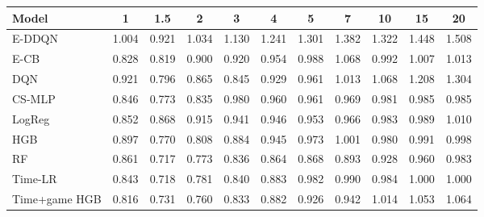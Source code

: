 \begin{tabular}{lcccccccccc}
\toprule
Model & 1 & 1.5 & 2 & 3 & 4 & 5 & 7 & 10 & 15 & 20 \\
\midrule
E-DDQN & 1.004 & 0.921 & 1.034 & 1.130 & 1.241 & 1.301 & 1.382 & 1.322 & 1.448 & 1.508 \\
E-CB & 0.828 & 0.819 & 0.900 & 0.920 & 0.954 & 0.988 & 1.068 & 0.992 & 1.007 & 1.013 \\
DQN & 0.921 & 0.796 & 0.865 & 0.845 & 0.929 & 0.961 & 1.013 & 1.068 & 1.208 & 1.304 \\
CS-MLP & 0.846 & 0.773 & 0.835 & 0.980 & 0.960 & 0.961 & 0.969 & 0.981 & 0.985 & 0.985 \\
LogReg & 0.852 & 0.868 & 0.915 & 0.941 & 0.946 & 0.953 & 0.966 & 0.983 & 0.989 & 1.010 \\
HGB & 0.897 & 0.770 & 0.808 & 0.884 & 0.945 & 0.973 & 1.001 & 0.980 & 0.991 & 0.998 \\
RF & 0.861 & 0.717 & 0.773 & 0.836 & 0.864 & 0.868 & 0.893 & 0.928 & 0.960 & 0.983 \\
Time-LR & 0.843 & 0.718 & 0.781 & 0.840 & 0.883 & 0.982 & 0.990 & 0.984 & 1.000 & 1.000 \\
Time+game HGB & 0.816 & 0.731 & 0.760 & 0.833 & 0.882 & 0.926 & 0.942 & 1.014 & 1.053 & 1.064 \\
\bottomrule
\end{tabular}
